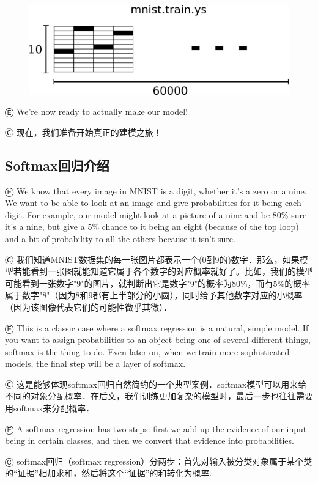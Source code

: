 \begin{figure}[htbp]
\centering
\includegraphics[width=.7\textwidth]{../SOURCE/images/mnist-train-ys.png}
\caption{}
\end{figure}

Ⓔ \textcolor{etc}{We're now ready to actually make our model!}

Ⓒ 现在，我们准备开始真正的建模之旅！

\subsection {Softmax回归介绍}

Ⓔ We know that every image in MNIST is a digit, whether it's a zero or a nine. We want to be able to look at an image and give probabilities for it being each digit. For example, our model might look at a picture of a nine and be 80\% sure it's a nine, but give a 5\% chance to it being an eight (because of the top loop) and a bit of probability to all the others because it isn't sure.

Ⓒ 我们知道MNIST数据集的每一张图片都表示一个(0到9的)数字．那么，如果模型若能看到一张图就能知道它属于各个数字的对应概率就好了。比如，我们的模型可能看到一张数字"9"的图片，就判断出它是数字"9"的概率为80\%，而有5\%的概率属于数字"8"（因为8和9都有上半部分的小圆），同时给予其他数字对应的小概率（因为该图像代表它们的可能性微乎其微）．

Ⓔ This is a classic case where a softmax regression is a natural, simple model. If you want to assign probabilities to an object being one of several different things, softmax is the thing to do. Even later on, when we train more sophisticated models, the final step will be a layer of softmax.

Ⓒ 这是能够体现softmax回归自然简约的一个典型案例．softmax模型可以用来给不同的对象分配概率．在后文，我们训练更加复杂的模型时，最后一步也往往需要用softmax来分配概率．

Ⓔ A softmax regression has two steps: first we add up the evidence of our input being in certain classes, and then we convert that evidence into probabilities.

Ⓒ softmax回归（softmax regression）分两步：首先对输入被分类对象属于某个类的“证据”相加求和，然后将这个“证据”的和转化为概率.

